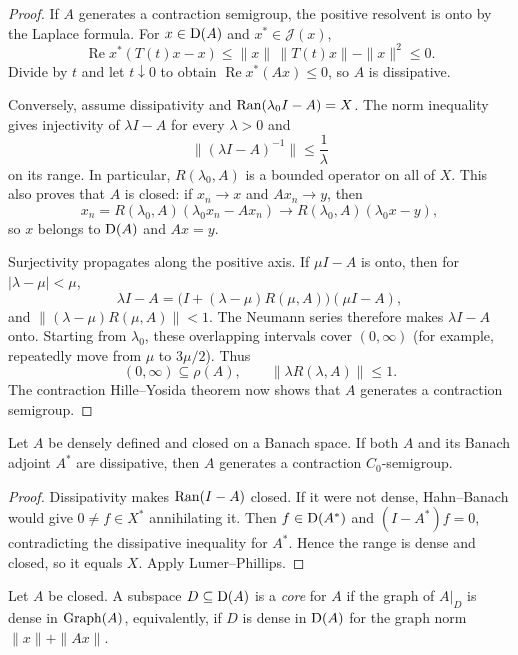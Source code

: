 \begin{proof}
If $A$ generates a contraction semigroup, the positive resolvent is onto by
the Laplace formula.  For $x\in\operatorname{D}(A)$ and $x^*\in\mathcal J(x)$,
\[
  \operatorname{Re}x^*(T(t)x-x)
  \le \|x\|\,\|T(t)x\|-\|x\|^2\le0.
\]
Divide by $t$ and let $t\downarrow0$ to obtain
$\operatorname{Re}x^*(Ax)\le0$, so $A$ is dissipative.

Conversely, assume dissipativity and
$\operatorname{Ran}(\lambda_0I-A)=X$.  The norm inequality gives injectivity of
$\lambda I-A$ for every $\lambda>0$ and
\[
  \|(\lambda I-A)^{-1}\|\le\frac1\lambda
\]
on its range.  In particular, $R(\lambda_0,A)$ is a bounded operator on all of
$X$.  This also proves that $A$ is closed: if $x_n\to x$ and $Ax_n\to y$, then
\[
  x_n=R(\lambda_0,A)(\lambda_0x_n-Ax_n)
  \longrightarrow R(\lambda_0,A)(\lambda_0x-y),
\]
so $x$ belongs to $\operatorname{D}(A)$ and $Ax=y$.

Surjectivity propagates along the positive axis.  If
$\mu I-A$ is onto, then for $|\lambda-\mu|<\mu$,
\[
  \lambda I-A
  =\bigl(I+(\lambda-\mu)R(\mu,A)\bigr)(\mu I-A),
\]
and
$\|(\lambda-\mu)R(\mu,A)\|<1$.  The Neumann series therefore makes
$\lambda I-A$ onto.  Starting from $\lambda_0$, these overlapping intervals
cover $(0,\infty)$ (for example, repeatedly move from $\mu$ to $3\mu/2$).
Thus
\[
  (0,\infty)\subseteq\rho(A),
  \qquad
  \|\lambda R(\lambda,A)\|\le1.
\]
The contraction Hille--Yosida theorem now shows that $A$ generates a
contraction semigroup.
\end{proof}

\begin{notecorollary}
Let $A$ be densely defined and closed on a Banach space.  If both $A$ and its
Banach adjoint $A^*$ are dissipative, then $A$ generates a contraction
$C_0$-semigroup.
\end{notecorollary}

\begin{proof}
Dissipativity makes $\operatorname{Ran}(I-A)$ closed.  If it were not dense, Hahn--Banach
would give $0\ne f\in X^*$ annihilating it.  Then $f\in\operatorname{D}(A^*)$ and
$(I-A^*)f=0$, contradicting the dissipative inequality for $A^*$.  Hence the
range is dense and closed, so it equals $X$.  Apply Lumer--Phillips.
\end{proof}

\begin{notedefinition}
Let $A$ be closed.  A subspace $D\subseteq\operatorname{D}(A)$ is a \emph{core} for $A$ if
the graph of $A|_D$ is dense in $\operatorname{Graph}(A)$, equivalently, if $D$ is dense in
$\operatorname{D}(A)$ for the graph norm $\|x\|+\|Ax\|$.
\end{notedefinition}

